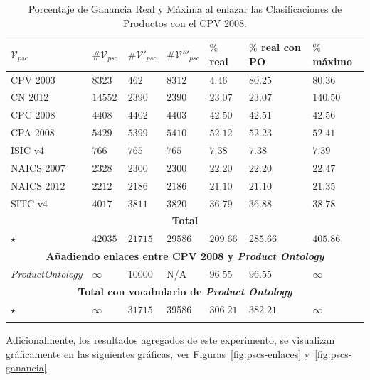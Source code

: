 \newpage
\begin{longtable}[c]{|p{2.6cm}|p{1.8cm}|p{1.8cm}|p{1.8cm}|p{1.8cm}|p{1.8cm}|p{1.8cm}|} 
\hline
  $\mathcal{V}_{psc}$ & $\#\mathcal{V}_{psc}$  & $\#\mathcal{V'}_{psc}$ &$\#\mathcal{V'''}_{psc}$ &  $\%$ real &  $\%$ real con PO  &  $\%$ máximo   \\\hline
\endhead
CPV 2003 	& $8323$  	& $462$		& $8312$ 	& $4.46$ 	& $80.25$	& $80.36$  \\ \hline
CN 2012  	& $14552$	& $2390$	& $2390$ 	& $23.07$	& $23.07$	& $140.50$  \\ \hline
CPC 2008 	& $4408$	& $4402$   	& $4403$	& $42.50$	& $42.51$ 	& $42.56$  \\ \hline
CPA 2008 	& $5429$	& $5399$   	& $5410$	& $52.12$	& $52.23$	& $52.41$  \\ \hline
ISIC v4  	& $766$		& $765$   	& $765$ 	& $7.38$ 	& $7.38$	& $7.39$    \\ \hline
NAICS 2007 	& $2328$	& $2300$ 	& $2300$	& $22.20$	& $22.20$	& $22.47$  \\ \hline
NAICS 2012 	& $2212$	& $2186$ 	& $2186$	& $21.10$	& $21.10$	& $21.35$  \\ \hline
SITC v4 	& $4017$	& $3811$   	& $3820$	& $36.79$	& $36.88$	& $38.78$  \\ \hline
\multicolumn{7}{|c|}{\textbf{Total}} \\ \hline
$\star$ & $42035$ 		& $21715$   	& $29586$	& $209.66$ 	& $285.66$	& $405.86$ \\ \hline
\hline
\multicolumn{7}{|c|}{\textbf{Añadiendo enlaces entre CPV 2008 y \textit{Product Ontology}}} \\ \hline
\textit{ProductOntology}& $\infty$	& $10000$   	& N/A	& $96.55$	& $96.55$ 	& $\infty$  \\ \hline
\multicolumn{7}{|c|}{\textbf{Total con vocabulario de \textit{Product Ontology}}} \\ \hline
$\star$	 & $\infty$	& $31715$   	& 39586	& $306.21$	& $382.21$	& $\infty$ \\ \hline
\hline
\caption{Porcentaje de Ganancia Real y Máxima al enlazar las Clasificaciones de Productos con el CPV 2008.}\label{ganancia-terminos}\\    
\end{longtable}


Adicionalmente, los resultados agregados de este experimento, 
se visualizan gráficamente en las siguientes gráficas, ver Figuras~\ref{fig:pscs-enlaces} y~\ref{fig:pscs-ganancia}.

